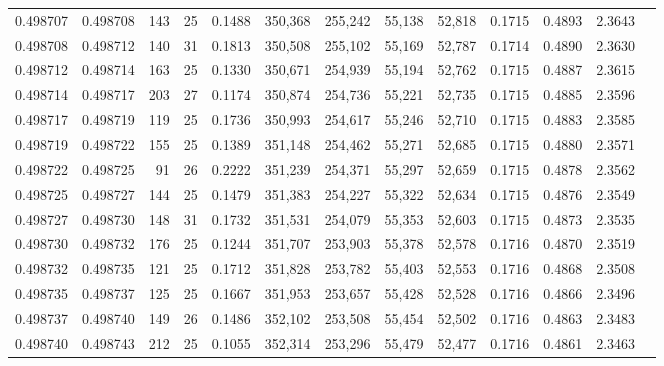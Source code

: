 \begin{tabular}{rrrrrrrrrrrrr}
0.498707 & 0.498708 & 143 &  25 &                                     0.1488 & 350,368 & 255,242 &  55,138 &  52,818 & 0.1715 & 0.4893 & 2.3643 \\
0.498708 & 0.498712 & 140 &  31 &                                     0.1813 & 350,508 & 255,102 &  55,169 &  52,787 & 0.1714 & 0.4890 & 2.3630 \\
0.498712 & 0.498714 & 163 &  25 &                                     0.1330 & 350,671 & 254,939 &  55,194 &  52,762 & 0.1715 & 0.4887 & 2.3615 \\
0.498714 & 0.498717 & 203 &  27 &                                     0.1174 & 350,874 & 254,736 &  55,221 &  52,735 & 0.1715 & 0.4885 & 2.3596 \\
0.498717 & 0.498719 & 119 &  25 &                                     0.1736 & 350,993 & 254,617 &  55,246 &  52,710 & 0.1715 & 0.4883 & 2.3585 \\
0.498719 & 0.498722 & 155 &  25 &                                     0.1389 & 351,148 & 254,462 &  55,271 &  52,685 & 0.1715 & 0.4880 & 2.3571 \\
0.498722 & 0.498725 &  91 &  26 &                                     0.2222 & 351,239 & 254,371 &  55,297 &  52,659 & 0.1715 & 0.4878 & 2.3562 \\
0.498725 & 0.498727 & 144 &  25 &                                     0.1479 & 351,383 & 254,227 &  55,322 &  52,634 & 0.1715 & 0.4876 & 2.3549 \\
0.498727 & 0.498730 & 148 &  31 &                                     0.1732 & 351,531 & 254,079 &  55,353 &  52,603 & 0.1715 & 0.4873 & 2.3535 \\
0.498730 & 0.498732 & 176 &  25 &                                     0.1244 & 351,707 & 253,903 &  55,378 &  52,578 & 0.1716 & 0.4870 & 2.3519 \\
0.498732 & 0.498735 & 121 &  25 &                                     0.1712 & 351,828 & 253,782 &  55,403 &  52,553 & 0.1716 & 0.4868 & 2.3508 \\
0.498735 & 0.498737 & 125 &  25 &                                     0.1667 & 351,953 & 253,657 &  55,428 &  52,528 & 0.1716 & 0.4866 & 2.3496 \\
0.498737 & 0.498740 & 149 &  26 &                                     0.1486 & 352,102 & 253,508 &  55,454 &  52,502 & 0.1716 & 0.4863 & 2.3483 \\
0.498740 & 0.498743 & 212 &  25 &                                     0.1055 & 352,314 & 253,296 &  55,479 &  52,477 & 0.1716 & 0.4861 & 2.3463 \\

\end{tabular}
